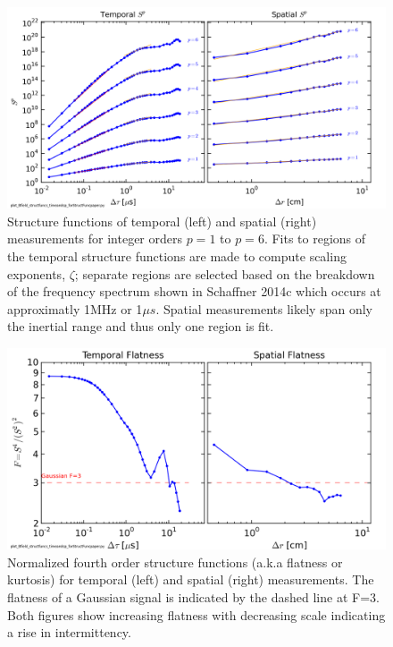 \documentclass[preprint2]{aastex}
\begin{document}
\begin{figure}
\includegraphics{Bmod_timeandspace_StructureFunction100313Shots41to80_forStructFuncpaper.png}
\caption{\label{fig:structfuncs} Structure functions of temporal (left) and spatial (right) measurements for integer orders $p=1$ to $p=6$. Fits to regions of the temporal structure functions are made to compute scaling exponents, $\zeta$; separate regions are selected based on the breakdown of the frequency spectrum shown in Schaffner 2014c which occurs at approximatly 1MHz or 1$\mu s$. Spatial measurements likely span only the inertial range and thus only one region is fit. }
\end{figure}

\begin{figure}
\includegraphics[width={\columnwidth}]{Bmod_timeandspace_Flatness100313Shots41to80_forStructFuncpaper.png}
\caption{\label{fig:flatness} Normalized fourth order structure functions (a.k.a flatness or kurtosis) for temporal (left) and spatial (right) measurements. The flatness of a Gaussian signal is indicated by the dashed line at F=3. Both figures show increasing flatness with decreasing scale indicating a rise in intermittency.}
\end{figure}
\end{document}
